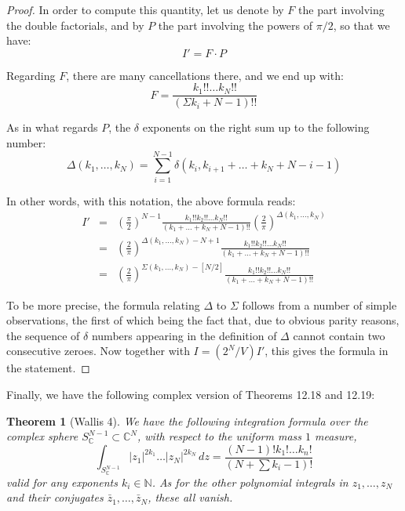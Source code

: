 \documentclass[12pt]{amsbook}
\newtheorem{theorem}{Theorem}[chapter]
\begin{document}
\begin{proof}
In order to compute this quantity, let us denote by $F$ the part involving the double factorials, and by $P$ the part involving the powers of $\pi/2$, so that we have:
$$I'=F\cdot P$$

Regarding $F$, there are many cancellations there, and we end up with:
$$F=\frac{k_1!!\ldots k_N!!}{(\Sigma k_i+N-1)!!}$$

As in what regards $P$, the $\delta$ exponents on the right sum up to the following number:
$$\Delta(k_1,\ldots,k_N)=\sum_{i=1}^{N-1}\delta(k_i,k_{i+1}+\ldots+k_N+N-i-1)$$

In other words, with this notation, the above formula reads:
\begin{eqnarray*}
I'
&=&\left(\frac{\pi}{2}\right)^{N-1}\frac{k_1!!k_2!!\ldots k_N!!}{(k_1+\ldots+k_N+N-1)!!}\left(\frac{2}{\pi}\right)^{\Delta(k_1,\ldots,k_N)}\\
&=&\left(\frac{2}{\pi}\right)^{\Delta(k_1,\ldots,k_N)-N+1}\frac{k_1!!k_2!!\ldots k_N!!}{(k_1+\ldots+k_N+N-1)!!}\\
&=&\left(\frac{2}{\pi}\right)^{\Sigma(k_1,\ldots,k_N)-[N/2]}\frac{k_1!!k_2!!\ldots k_N!!}{(k_1+\ldots+k_N+N-1)!!}
\end{eqnarray*}

To be more precise, the formula relating $\Delta$ to $\Sigma$ follows from a number of simple observations, the first of which being the fact that, due to obvious parity reasons, the sequence of $\delta$ numbers appearing in the definition of $\Delta$ cannot contain two consecutive zeroes. Now together with $I=(2^N/V)I'$, this gives the formula in the statement.
\end{proof}

Finally, we have the following complex version of Theorems 12.18 and 12.19:


\begin{theorem}[Wallis 4]
We have the following integration formula over the complex sphere $S^{N-1}_\mathbb C\subset\mathbb C^N$, with respect to the uniform mass $1$ measure, 
$$\int_{S^{N-1}_\mathbb C}|z_1|^{2k_1}\ldots|z_N|^{2k_N}\,dz=\frac{(N-1)!k_1!\ldots k_n!}{(N+\sum k_i-1)!}$$
valid for any exponents $k_i\in\mathbb N$. As for the other polynomial integrals in $z_1,\ldots,z_N$ and their conjugates $\bar{z}_1,\ldots,\bar{z}_N$, these all vanish.
\end{theorem}
\end{document}
